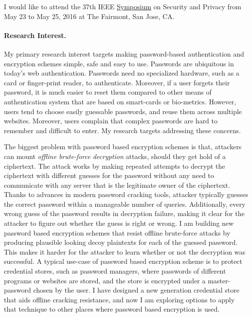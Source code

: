 \documentclass[11pt,a4paper,notitlepage]{article}
\begin{document}
I would like to attend the 37th IEEE \underline{Symposium} on Security
and Privacy from May 23 to May 25, 2016 at The Fairmont, San Jose, CA.

\paragraph{Research Interest.}
My primary research interest targets making password-based
authentication and encryption schemes simple, safe and easy to use.
Passwords are ubiquitous in today's web authentication. Passwords need
no specialized hardware, such as a card or finger-print reader, to
authenticate. Moreover, if a user forgets their password, it is much
easier to reset them compared to other means of authentication system
that are based on smart-cards or bio-metrics.  However, users tend to
choose easily guessable passwords, and reuse them across multiple
websites. Moreover, users complain that complex passwords are hard to
remember and difficult to enter. My research targets addressing these
concerns.


The biggest problem with password based encryption schemes is that,
attackers can mount {\em offline brute-force decryption} attacks,
should they get hold of a ciphertext. The attack works by making
repeated attempts to decrypt the ciphertext with different guesses for
the password without any need to communicate with any server that is
the legitimate owner of the ciphertext. Thanks to advances in modern
password cracking tools, attacker typically guesses the correct
password within a manageable number of queries. Additionally, every
wrong guess of the password results in decryption failure, making it
clear for the attacker to figure out whether the guess is right or
wrong. I am building new password based encryption schemes that resist
offline brute-force attacks by producing plausible looking decoy
plaintexts for each of the guessed password.  This makes it harder for
the attacker to learn whether or not the decryption was successful.  A
typical use-case of password based encryption scheme is to protect
credential stores, such as password managers, where passwords of
different programs or websites are stored, and the store is encrypted
under a master-password chosen by the user.  I have designed a new
generation credential store that aids offline cracking resistance, and
now I am exploring options to apply that technique to other places
where password based encryption is used.
\end{document}
